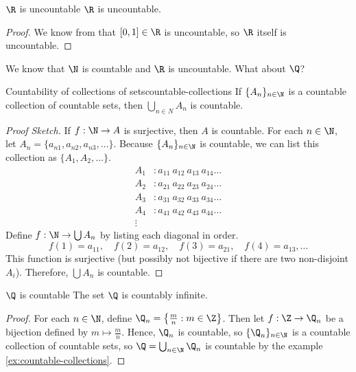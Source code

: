 \documentclass[letterpaper,12pt]{report}
\begin{document}
\begin{thmbox}{$\R$ is uncountable}{}
    $\R$ is uncountable.
    \tcblower
    \begin{proof}
        We know from  that $[0,1] \in \R$ is uncountable, so $\R$ itself is uncountable.
    \end{proof}
\end{thmbox}

We know that $\N$ is countable and $\R$ is uncountable. What about $\Q$?

\begin{exbox}{Countability of collections of sets}{countable-collections}
    If $\{A_n\}_{n \in \N}$ is a countable collection of countable sets, then $\bigcup_{n \in N} A_n$ is countable.
    \tcblower
    \begin{proof}[Proof Sketch]
        If $f : \N \to A$ is surjective, then $A$ is countable. For each $n \in \N$, let $A_n = \{ a_{n1}, a_{n2}, a_{n3}, \ldots\}$. Because $\{A_n\}_{n \in \N}$ is countable, we can list this collection as $\{ A_1, A_2, \ldots\}$.
        \begin{align*}
            A_1 &: a_{11}\ a_{12}\ a_{13}\ a_{14} \ldots \\
            A_2 &: a_{21}\ a_{22}\ a_{23}\ a_{24} \ldots \\
            A_3 &: a_{31}\ a_{32}\ a_{33}\ a_{34} \ldots \\
            A_4 &: a_{41}\ a_{42}\ a_{43}\ a_{44} \ldots \\
            \vdots
        \end{align*}
        Define $f : \N \to \bigcup A_n$ by listing each diagonal in order.
        \[ f(1) = a_{11}, \quad f(2) = a_{12},\quad f(3) = a_{21},\quad f(4) = a_{13}, \ldots \]
        This function is surjective (but possibly not bijective if there are two non-disjoint $A_i$). Therefore, $\bigcup A_n$ is countable.
    \end{proof}
\end{exbox}

\begin{exbox}{$\Q$ is countable}{}
    The set $\Q$ is countably infinite.
    \tcblower
    \begin{proof}
        For each $n \in \N$, define $\Q_n = \left\{ \frac{m}{n} : m \in \Z \right\}$. Then let $f : \Z \to \Q_n$ be a bijection defined by $m \mapsto \frac{m}{n}$. Hence, $\Q_n$ is countable, so $\{\Q_n\}_{n \in \N}$ is a countable collection of countable sets, so
        $\Q = \bigcup_{n \in \N} \Q_n$ is countable by the example \ref{ex:countable-collections}.
    \end{proof}
\end{exbox}

\makeamzindex
\end{document}
